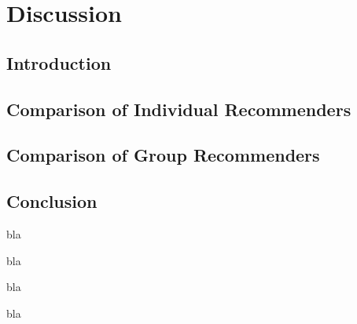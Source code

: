 
\chapter{Discussion}\label{chapter:discussion}

\section{Introduction}

\section{Comparison of Individual Recommenders}

\section{Comparison of Group Recommenders}


\section{Conclusion}

bla

bla

bla

bla